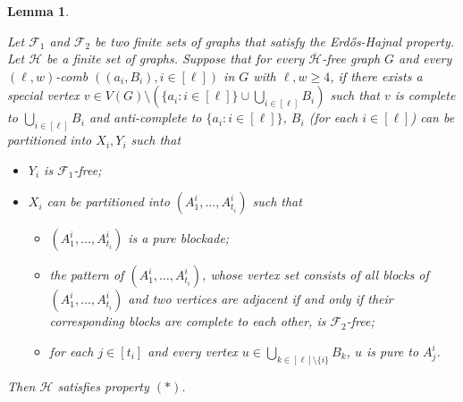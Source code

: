 \documentclass[a4paper,11pt]{article}
\newtheorem{lemma}[theorem]{Lemma}
\begin{document}
    \begin{lemma}\label{lem:property of co-E}
       
        Let $\mathcal{F}_1$ and $\mathcal{F}_2$ be two finite sets of graphs that satisfy the Erd\H{o}s-Hajnal property. 
        Let $\mathcal{H}$ be a finite set of graphs.
        Suppose that for every $\overline{\mathcal{H}}$-free graph $G$ and every $(\ell,w)$-comb $((a_i,B_i),i\in[\ell])$ in $G$ with $\ell,w\geq 4$, if there exists a special vertex $v\in V(G)\setminus(\{a_i:i\in[\ell]\}\cup\bigcup_{i\in[\ell]}B_i)$ such that $v$ is complete to $\bigcup_{i\in[\ell]}B_i$ and anti-complete to $\{a_i:i\in[\ell]\}$,
        $B_i$ (for each $i\in[\ell]$) can be partitioned into $X_i,Y_i$ such that 
        \begin{itemize}
            \item[$(1)$] $Y_i$ is $\mathcal{F}_1$-free;  
            \item[$(2)$] $X_i$ can be partitioned into $(A^i_1,\ldots, A^i_{t_i})$ such that 
            \begin{itemize}
                \item[$(2.1)$] $(A^i_1,\ldots, A^i_{t_i})$ is a pure blockade; 
                \item[$(2.2)$] the pattern of $(A^i_1,\ldots, A^i_{t_i})$, whose vertex set consists of all blocks of $(A^i_1,\ldots, A^i_{t_i})$ and two vertices are adjacent if and only if their corresponding blocks are complete to each other, is $\mathcal{F}_2$-free; 
                \item[$(2.3)$] for each $j\in [t_i]$ and every vertex $u\in \bigcup_{k\in [\ell]\setminus \{i\}} B_k$, $u$ is pure to $A^i_j$.
            \end{itemize}
        \end{itemize} 
        Then $\mathcal{H}$ satisfies property $(*)$.
    \end{lemma}
\end{document}
